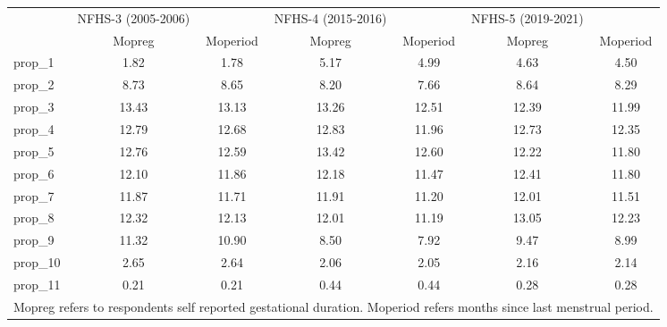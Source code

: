 \begin{tabular}{l*{6}{c}}
\toprule
            &NFHS-3 (2005-2006)&            &NFHS-4 (2015-2016)&            &NFHS-5 (2019-2021)&            \\
            &\multicolumn{1}{c}{Mopreg}&\multicolumn{1}{c}{Moperiod}&\multicolumn{1}{c}{Mopreg}&\multicolumn{1}{c}{Moperiod}&\multicolumn{1}{c}{Mopreg}&\multicolumn{1}{c}{Moperiod}\\
\midrule
\midrule
prop\_1      &        1.82&        1.78&        5.17&        4.99&        4.63&        4.50\\
prop\_2      &        8.73&        8.65&        8.20&        7.66&        8.64&        8.29\\
prop\_3      &       13.43&       13.13&       13.26&       12.51&       12.39&       11.99\\
prop\_4      &       12.79&       12.68&       12.83&       11.96&       12.73&       12.35\\
prop\_5      &       12.76&       12.59&       13.42&       12.60&       12.22&       11.80\\
prop\_6      &       12.10&       11.86&       12.18&       11.47&       12.41&       11.80\\
prop\_7      &       11.87&       11.71&       11.91&       11.20&       12.01&       11.51\\
prop\_8      &       12.32&       12.13&       12.01&       11.19&       13.05&       12.23\\
prop\_9      &       11.32&       10.90&        8.50&        7.92&        9.47&        8.99\\
prop\_10     &        2.65&        2.64&        2.06&        2.05&        2.16&        2.14\\
prop\_11     &        0.21&        0.21&        0.44&        0.44&        0.28&        0.28\\
\bottomrule
\multicolumn{7}{l}{\footnotesize Mopreg refers to respondents self reported gestational duration. Moperiod refers months since last menstrual period.}\\
\end{tabular}
